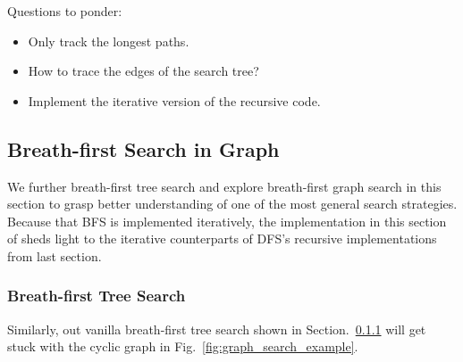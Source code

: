 \documentclass[main.tex]{subfiles}
\begin{document}
\begin{bclogo}[couleur = blue!30, arrondi=0.1,logo=\bccrayon,ombre=true]{Questions to ponder: } 
\begin{itemize}
\item Only track the longest paths.
\item How to trace the edges of the search tree?
\item Implement the iterative version of the recursive code.
\end{itemize}
\end{bclogo}

\subsection{Breath-first Search in Graph}
We further breath-first tree search and explore breath-first graph search in this section to grasp better understanding of one of the most general search strategies. Because that BFS is implemented iteratively, the implementation in this section of sheds light to the iterative counterparts of DFS's recursive implementations from last section. 
\subsubsection{Breath-first Tree Search}
Similarly, out vanilla breath-first tree search shown in Section.~\ref{} will get stuck with the cyclic graph in Fig.~\ref{fig:graph_search_example}. 
\end{document}
